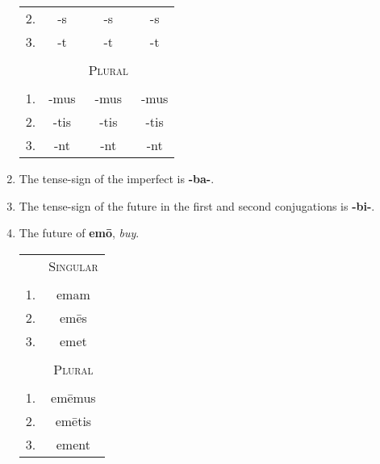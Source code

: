 \documentclass[12pt]{article}
\begin{document}
\begin{enumerate}[1.]
\begin{center}
\begin{tabular}{ c c c c }
		\textsc{2}. & -s & -s & -s \\
		\textsc{3}. & -t & -t & -t \\
		& & & \\
		& & \textsc{Plural} & \\
		& & & \\
		\textsc{1}. & -mus & -mus & -mus \\
		\textsc{2}. & -tis & -tis & -tis \\
		\textsc{3}. & -nt & -nt & -nt \\
		\end{tabular}
	\end{center}
	\item The tense-sign of the imperfect is \textbf{-ba-}.
	\item The tense-sign of the future in the first and second conjugations is \textbf{-bi-}.
	\item The future of \textbf{emō}, \textit{buy}.
	\begin{center}
		\begin{tabular}{ c c }
		& \textsc{Singular} \\
		& \\
		\textsc{1}. & emam \\
		\textsc{2}. & emēs \\
		\textsc{3}. & emet \\
		& \\
		& \textsc{Plural} \\
		& \\
		\textsc{1}. & emēmus \\
		\textsc{2}. & emētis \\
		\textsc{3}. & ement
		\end{tabular}
	\end{center}
\end{enumerate}
\end{document}

